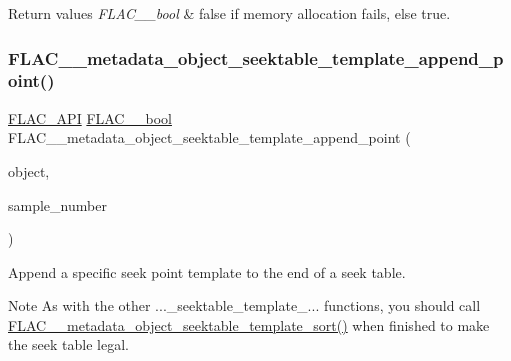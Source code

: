 \begin{DoxyRetVals}{Return values}
{\em F\+L\+A\+C\+\_\+\+\_\+bool} & {\ttfamily false} if memory allocation fails, else {\ttfamily true}. \\
\hline
\end{DoxyRetVals}
\mbox{\label{group__flac__metadata__object_ga9ce1940ca29d71739316cf104256c078}} 
\subsubsection{\texorpdfstring{F\+L\+A\+C\+\_\+\+\_\+metadata\+\_\+object\+\_\+seektable\+\_\+template\+\_\+append\+\_\+point()}{FLAC\_\_metadata\_object\_seektable\_template\_append\_point()}}
{\footnotesize\ttfamily \hyperlink{group__flac__export_ga56ca07df8a23310707732b1c0007d6f5}{F\+L\+A\+C\+\_\+\+A\+PI} \hyperlink{ordinals_8h_a95103469f1cbd78b8cf250194985b34e}{F\+L\+A\+C\+\_\+\+\_\+bool} F\+L\+A\+C\+\_\+\+\_\+metadata\+\_\+object\+\_\+seektable\+\_\+template\+\_\+append\+\_\+point (\begin{DoxyParamCaption}\item[{\hyperlink{struct_f_l_a_c_____stream_metadata}{F\+L\+A\+C\+\_\+\+\_\+\+Stream\+Metadata} $\ast$}]{object,  }\item[{\hyperlink{ordinals_8h_aa78c8c70a3eb8a58af7436f278acde8e}{F\+L\+A\+C\+\_\+\+\_\+uint64}}]{sample\+\_\+number }\end{DoxyParamCaption})}

Append a specific seek point template to the end of a seek table.

\begin{DoxyNote}{Note}
As with the other ...\+\_\+seektable\+\_\+template\+\_\+... functions, you should call \hyperlink{group__flac__metadata__object_gaee6a1f08321b56a3fa65af94dd7830cd}{F\+L\+A\+C\+\_\+\+\_\+metadata\+\_\+object\+\_\+seektable\+\_\+template\+\_\+sort()} when finished to make the seek table legal.
\end{DoxyNote}

